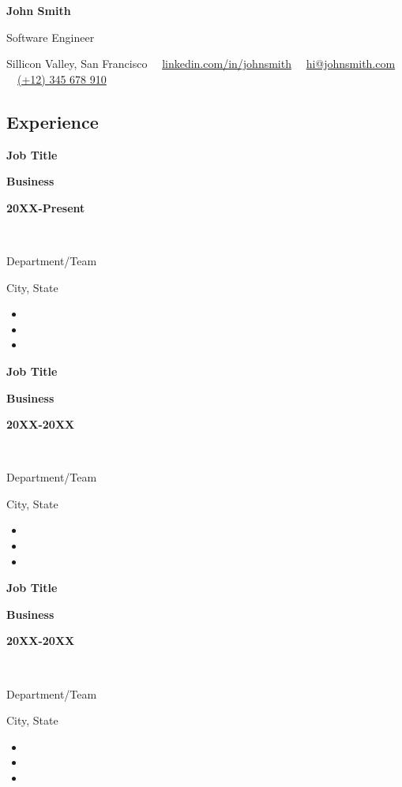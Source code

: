 \documentclass[10pt,a4paper]{article}
\newcommand\splitlinehalf[3][t]{%
  \parbox[#1]{\splitcolone\textwidth}{\raggedright#2}%
  \parbox[#1]{\splitcoltwo\textwidth}{\centering#3}%
}
\newcommand\splitlinethirds[4][t]{%
  \parbox[#1]{\splitcolone\textwidth}{\raggedright#2}%
  \parbox[#1]{\splitcoltwo\textwidth}{\centering#3}%
  \parbox[#1]{\splitcolthree\textwidth}{\raggedleft#4}%
}
\def \splitcolone {0.35}
\def \splitcoltwo {0.35}
\def \splitcolthree {0.3}
\begin{document}

\begin{center}
	{\LARGE \textbf{John Smith}}\vspace{0.2cm}
			
	{\large Software Engineer}\vspace{0.2cm}
			
	\faHome Sillicon Valley, San Francisco \ \
	\faLinkedin\href{https://linkedin.com/in/johnsmith}{linkedin.com/in/johnsmith} \ \
	\faEnvelope\href{mailto:hi@johnsmith.com}{hi@johnsmith.com} \ \
	\faMobile\href{tel:+12345678910}{(+12) 345 678 910} \ \
\end{center}

\lipsum[1][1-9]


\subsection*{\textcolor{accent}{\Large Experience  \sout{\hfill}}} 

\splitlinethirds{\textbf{Job Title}}{\textbf{Business}}{\textbf{20XX-Present}}\\
\splitlinehalf{Department/Team}{City, State}
\begin{itemize}
	\item \lipsum[1][1-2]
	\item \lipsum[1][2-3]
	\item \lipsum[1][4-6]
\end{itemize}

\splitlinethirds{\textbf{Job Title}}{\textbf{Business}}{\textbf{20XX-20XX}}\\
\splitlinehalf{Department/Team}{City, State}
\begin{itemize}
	\item \lipsum[2][1-2]
	\item \lipsum[2][2-3]
	\item \lipsum[2][4-6]
\end{itemize}

\splitlinethirds{\textbf{Job Title}}{\textbf{Business}}{\textbf{20XX-20XX}}\\
\splitlinehalf{Department/Team}{City, State}
\begin{itemize}
	\item \lipsum[3][1-2]
	\item \lipsum[3][2-3]
	\item \lipsum[3][4-6]
\end{itemize}
\end{document}
